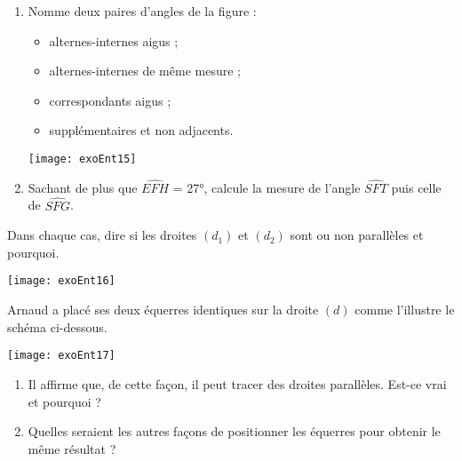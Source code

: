 \begin{exercice}
\begin{enumerate}
\item Nomme deux paires d'angles de la figure :
    \begin{itemize}
    \item alternes-internes aigus ;
    \item alternes-internes de même mesure ;
    \item correspondants aigus ;
    \item supplémentaires et non adjacents.
    \end{itemize}
    
\begin{center}
    \texttt{[image: exoEnt15]}
\end{center}

\item Sachant de plus que $\widehat{EFH}$ = 27°, calcule la mesure de l'angle $\widehat{SFT}$ puis celle de $\widehat{SFG}$.
\end{enumerate}
\end{exercice}

\columnbreak
{}



\begin{exercice}
Dans chaque cas, dire si les droites $(d_1)$ et $(d_2)$ sont ou non parallèles et pourquoi.
\begin{center}
    \texttt{[image: exoEnt16]}
\end{center}
\end{exercice} 



\begin{exercice}
Arnaud a placé ses deux équerres identiques sur la droite $(d)$ comme l'illustre le schéma ci-dessous.

\begin{center}
    \texttt{[image: exoEnt17]}
\end{center}

\begin{enumerate}
\item Il affirme que, de cette façon, il peut tracer des droites parallèles. Est-ce vrai et pourquoi ?
\item Quelles seraient les autres façons de positionner les équerres pour obtenir le même résultat ?
\end{enumerate}
\end{exercice} 



